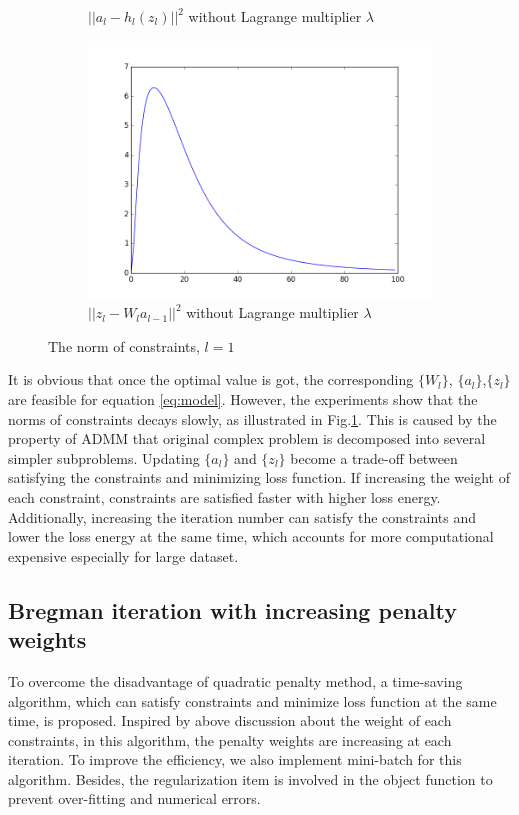 \documentclass[letterpaper, 10 pt, conference]{ieeeconf}  %
\begin{document}
\begin{figure}
\begin{subfigure}{0.8\columnwidth}
\caption{$||a_l-h_l(z_l)||^2$ without Lagrange multiplier $\lambda$}
\end{subfigure}
\begin{subfigure}{0.8\columnwidth}
\centering
\includegraphics[width=0.7\columnwidth]{figure/zConstraint_no_lambda.png}
\caption{$||z_l-W_la_{l-1}||^2$ without Lagrange multiplier $\lambda$}
\end{subfigure}
\caption{The norm of constraints, $l=1$}
\label{fig:cmpCons}
\end{figure}

It is obvious that once the optimal value is got, the corresponding $\{W_l\}$, $\{a_l\}$,$\{z_l\}$ are feasible for equation \eqref{eq:model}. However, the experiments show that the norms of constraints decays slowly, as illustrated in Fig.\ref{fig:cmpCons}. This is caused by the property of ADMM that original complex problem is decomposed into several simpler subproblems. Updating $\{a_l\}$ and $\{z_l\}$ become a trade-off between satisfying the constraints and minimizing loss function. If increasing the weight of each constraint, constraints are satisfied faster with higher loss energy. Additionally, increasing the iteration number can satisfy the constraints and lower the loss energy at the same time, which accounts for more computational expensive especially for large dataset.

\subsection{Bregman iteration with increasing penalty weights}
To overcome the disadvantage of quadratic penalty method, a time-saving algorithm, which can satisfy constraints and minimize loss function at the same time, is proposed. Inspired by above discussion about the weight of each constraints, in this algorithm, the penalty weights are increasing at each iteration. To improve the efficiency, we also implement mini-batch for this algorithm. Besides, the regularization item is involved in the object function to prevent over-fitting and numerical errors.
\end{document}
